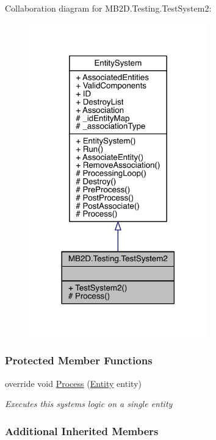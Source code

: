 Collaboration diagram for M\+B2\+D.\+Testing.\+Test\+System2\+:
\nopagebreak
\begin{figure}[H]
\begin{center}
\leavevmode
\includegraphics[width=218pt]{class_m_b2_d_1_1_testing_1_1_test_system2__coll__graph}
\end{center}
\end{figure}
\subsubsection*{Protected Member Functions}
\begin{DoxyCompactItemize}
\item 
override void \hyperlink{class_m_b2_d_1_1_testing_1_1_test_system2_a0fbdd06fd0de796cfec32b7e025f73fe}{Process} (\hyperlink{class_m_b2_d_1_1_entity_component_1_1_entity}{Entity} entity)
\begin{DoxyCompactList}\small\item\em Executes this systems logic on a single entity \end{DoxyCompactList}\end{DoxyCompactItemize}
\subsubsection*{Additional Inherited Members}


